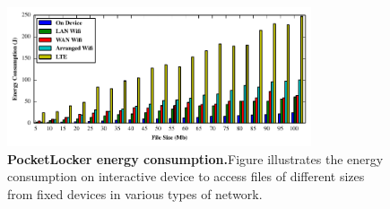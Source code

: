 \begin{figure}[t]
  \centering
  \includegraphics[width=0.8\textwidth]{./figures/energyconsumption.pdf}
  
  \vspace*{-0.1in}

  \caption{\small \textbf{PocketLocker energy consumption.}Figure illustrates the energy
  consumption on interactive device to access files of different sizes from
fixed devices in various types of network.}

  \label{fig-evaluation-energy}
  
  \vspace*{0.05in}


  \vspace*{-0.2in}

\end{figure}


